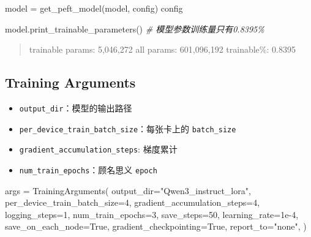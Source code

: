 \documentclass[
]{article}
\newenvironment{Shaded}{}{}
\newcommand{\CommentTok}[1]{\textcolor[rgb]{0.38,0.63,0.69}{\textit{#1}}}
\newcommand{\DecValTok}[1]{\textcolor[rgb]{0.25,0.63,0.44}{#1}}
\newcommand{\FloatTok}[1]{\textcolor[rgb]{0.25,0.63,0.44}{#1}}
\newcommand{\NormalTok}[1]{#1}
\newcommand{\OperatorTok}[1]{\textcolor[rgb]{0.40,0.40,0.40}{#1}}
\newcommand{\StringTok}[1]{\textcolor[rgb]{0.25,0.44,0.63}{#1}}
\newcommand{\VariableTok}[1]{\textcolor[rgb]{0.10,0.09,0.49}{#1}}
\providecommand{\tightlist}{%
  \setlength{\itemsep}{0pt}\setlength{\parskip}{0pt}}
\begin{document}
\begin{Shaded}
\begin{Highlighting}[]
\NormalTok{model }\OperatorTok{=}\NormalTok{ get\_peft\_model(model, config)}
\NormalTok{config}
\end{Highlighting}
\end{Shaded}

\begin{Shaded}
\begin{Highlighting}[]
\NormalTok{model.print\_trainable\_parameters()  }\CommentTok{\# 模型参数训练量只有0.8395\%}
\end{Highlighting}
\end{Shaded}

\begin{quote}
trainable params: 5,046,272 \textbar\textbar{} all params: 601,096,192
\textbar\textbar{} trainable\%: 0.8395
\end{quote}

\subsection{Training Arguments}\label{training-arguments}

\begin{itemize}
\tightlist
\item
  \texttt{output\_dir}：模型的输出路径
\item
  \texttt{per\_device\_train\_batch\_size}：每张卡上的
  \texttt{batch\_size}
\item
  \texttt{gradient\_accumulation\_steps}: 梯度累计
\item
  \texttt{num\_train\_epochs}：顾名思义 \texttt{epoch}
\end{itemize}

\begin{Shaded}
\begin{Highlighting}[]
\NormalTok{args }\OperatorTok{=}\NormalTok{ TrainingArguments(}
\NormalTok{    output\_dir}\OperatorTok{=}\StringTok{"Qwen3\_instruct\_lora"}\NormalTok{,}
\NormalTok{    per\_device\_train\_batch\_size}\OperatorTok{=}\DecValTok{4}\NormalTok{,}
\NormalTok{    gradient\_accumulation\_steps}\OperatorTok{=}\DecValTok{4}\NormalTok{,}
\NormalTok{    logging\_steps}\OperatorTok{=}\DecValTok{1}\NormalTok{,}
\NormalTok{    num\_train\_epochs}\OperatorTok{=}\DecValTok{3}\NormalTok{,}
\NormalTok{    save\_steps}\OperatorTok{=}\DecValTok{50}\NormalTok{,}
\NormalTok{    learning\_rate}\OperatorTok{=}\FloatTok{1e{-}4}\NormalTok{,}
\NormalTok{    save\_on\_each\_node}\OperatorTok{=}\VariableTok{True}\NormalTok{,}
\NormalTok{    gradient\_checkpointing}\OperatorTok{=}\VariableTok{True}\NormalTok{,}
\NormalTok{    report\_to}\OperatorTok{=}\StringTok{"none"}\NormalTok{,}
\NormalTok{)}
\end{Highlighting}
\end{Shaded}
\end{document}
